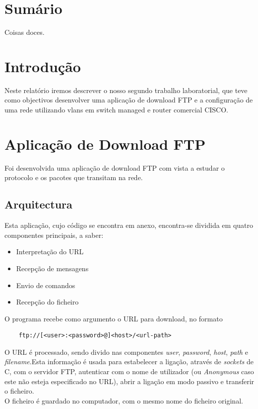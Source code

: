 \documentclass[a4paper,11pt]{article}
\begin{document}

\newpage
\section{Sumário}
Coisas doces.

\section{Introdução}
Neste relatório iremos descrever o nosso segundo trabalho laboratorial, que teve como objectivos desenvolver uma aplicação de download FTP e a configuração de uma rede utilizando vlans em switch managed e router comercial CISCO.

\section{Aplicação de Download FTP}
Foi desenvolvida uma aplicação de download FTP com vista a estudar o protocolo e os pacotes que transitam na rede.
\subsection{Arquitectura}
Esta aplicação, cujo código se encontra em anexo, encontra-se dividida em quatro componentes principais, a saber:
\begin{itemize}
\item Interpretação do URL
\item Recepção de mensagens
\item Envio de comandos
\item Recepção do ficheiro
\end{itemize}
\vspace{5pt}

O programa recebe como argumento o URL para download, no formato
\begin{lstlisting}
	ftp://[<user>:<password>@]<host>/<url-path>
\end{lstlisting}

O URL é processado, sendo divido nas componentes \textit{user}, \textit{password}, \textit{host}, \textit{path} e \textit{filename}.Esta informação é usada para estabelecer a ligação, através de \textit{sockets} de C, com o servidor FTP, autenticar com o nome de utilizador (ou \textit{Anonymous} caso este não esteja especificado no URL), abrir a ligação em modo passivo e transferir o ficheiro.\\
O ficheiro é guardado no computador, com o mesmo nome do ficheiro original.\\
\end{document}
